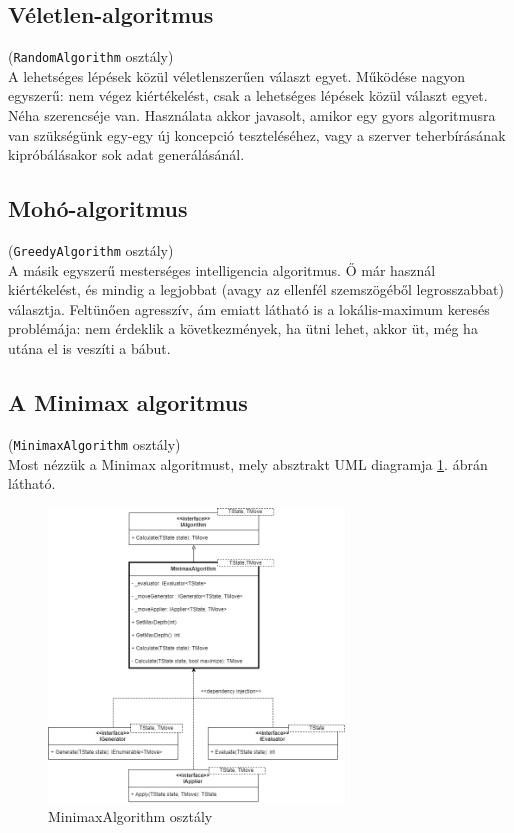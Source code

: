 \documentclass[twoside, a4paper, 12pt]{book}
\begin{document}
\subsection{Véletlen-algoritmus}
\noindent(\texttt{RandomAlgorithm} osztály) \\
A lehetséges lépések közül véletlenszerűen választ egyet. Működése nagyon egyszerű: nem végez kiértékelést, csak a lehetséges lépések közül választ egyet. Néha szerencséje van.
Használata akkor javasolt, amikor egy gyors algoritmusra van szükségünk egy-egy új koncepció teszteléséhez, vagy a szerver teherbírásának kipróbálásakor sok adat generálásánál.

\subsection{Mohó-algoritmus}
\noindent(\texttt{GreedyAlgorithm} osztály) \\
A másik egyszerű mesterséges intelligencia algoritmus. Ő már használ kiértékelést, és mindig a legjobbat (avagy az ellenfél szemszögéből legrosszabbat) választja. Feltünően agresszív, ám emiatt látható is a lokális-maximum keresés problémája: nem érdeklik a következmények, ha ütni lehet, akkor üt, még ha utána el is veszíti a bábut. 

\subsection{A Minimax algoritmus}
\noindent(\texttt{MinimaxAlgorithm} osztály) \\
Most nézzük a Minimax algoritmust, mely absztrakt UML diagramja \ref{fig:minimaxAbstractDiagram}. ábrán látható.

\begin{figure}[htbp]
	\centering
	\includegraphics[width=0.7\textwidth]{img/minimaxAbstractDiagram.png}
	\caption{MinimaxAlgorithm osztály}
	\label{fig:minimaxAbstractDiagram}
\end{figure}
\end{document}
